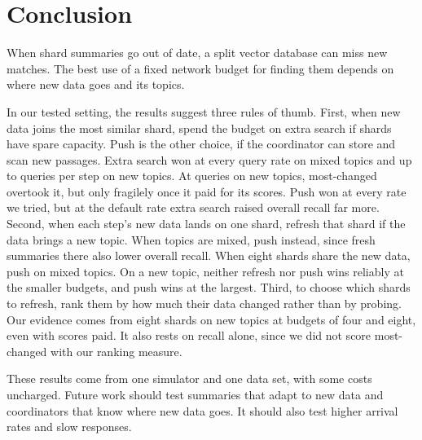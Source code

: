 \section{Conclusion}
\label{sec:conclusion}

When shard summaries go out of date, a split vector database can miss new matches.
The best use of a fixed network budget for finding them depends on where new data goes and its topics.

In our tested setting, the results suggest three rules of thumb.
First, when new data joins the most similar shard, spend the budget on extra search if shards have spare capacity.
Push is the other choice, if the coordinator can store and scan new passages.
Extra search won at every query rate on mixed topics and up to \RNumPlainQueriesDefault{} queries per step on new topics.
At \RNumPlainQueriesHigh{} queries on new topics, most-changed overtook it, but only fragilely once it paid for its scores.
Push won at every rate we tried, but at the default rate extra search raised overall recall far more.
Second, when each step's new data lands on one shard, refresh that shard if the data brings a new topic.
When topics are mixed, push instead, since fresh summaries there also lower overall recall.
When eight shards share the new data, push on mixed topics.
On a new topic, neither refresh nor push wins reliably at the smaller budgets, and push wins at the largest.
Third, to choose which shards to refresh, rank them by how much their data changed rather than by probing.
Our evidence comes from eight shards on new topics at budgets of four and eight, even with scores paid.
It also rests on recall alone, since we did not score most-changed with our ranking measure.

These results come from one simulator and one data set, with some costs uncharged.
Future work should test summaries that adapt to new data and coordinators that know where new data goes.
It should also test higher arrival rates and slow responses.
